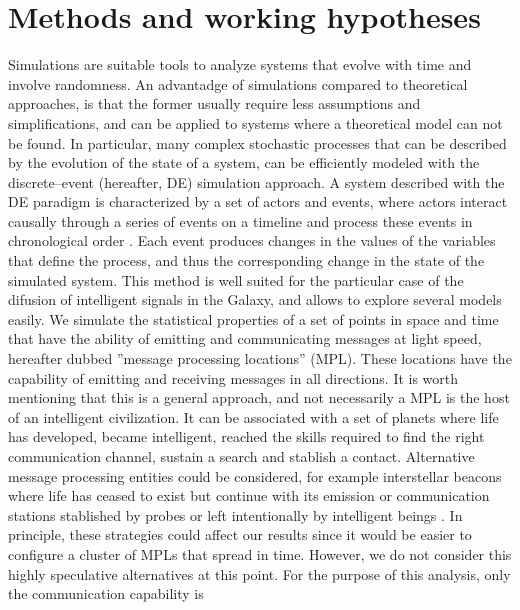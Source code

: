 \section{Methods and working hypotheses}\label{S_methods}

Simulations are suitable tools to analyze systems that evolve with
time and involve randomness.
%
An advantadge of simulations compared to theoretical approaches, is
that the former usually require less assumptions and simplifications,
and can be applied to systems where a theoretical model can not be
found.
%
In particular, many complex stochastic processes that can be described
by the evolution of the state of a system, can be efficiently modeled
with the discrete--event (hereafter, DE) simulation approach.
%
A system described with the DE paradigm is characterized by a set of
actors and events, where actors interact causally through a series of
events on a timeline and process these events in chronological order
\citep{ptolemaeus_system_2014, chung_simulation_2003,
ross_simulation_2012}.
%
Each event produces changes in the values of the variables that define
the process, and thus the corresponding change in the state of the
simulated system.
%
This method is well suited for the particular case of the difusion of
intelligent signals in the Galaxy, and allows to explore several
models easily.
%
We simulate the statistical properties of a set of points in space and
time that have the ability of emitting and communicating messages at
light speed, hereafter dubbed ''message processing locations'' (MPL).
%
These locations have the capability of emitting and receiving messages
in all directions.
%
It is worth mentioning that this is a general approach, and not
necessarily a MPL is the host of an intelligent civilization.
%
It can be associated with a set of planets where life has developed,
became intelligent, reached the skills required to find the right
communication channel, sustain a search and stablish a contact.
%
Alternative message processing entities could be considered, for
example interstellar beacons where life has ceased to exist but
continue with its emission or communication stations stablished by
probes or left intentionally by intelligent beings \citep[see, e.g.,
][]{peters_outer_2018, barlow_galactic_2013}.
%
In principle, these strategies could affect our results since it would
be easier to configure a cluster of MPLs that spread in time.
%
However, we do not consider this highly speculative alternatives at
this point.
%
%
For the purpose of this analysis, only the communication capability is
